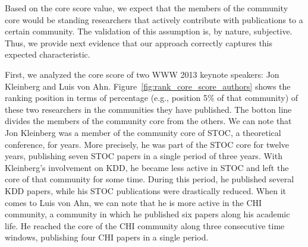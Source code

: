 Based on the core score value, we expect that the members of the community core would be standing researchers that actively contribute with publications to a certain community.
The validation of this assumption is, by nature, subjective.  Thus, we provide next evidence that our approach correctly captures this expected characteristic.

First, we analyzed the core score of two WWW 2013 keynote speakers: Jon Kleinberg and Luis von Ahn.  Figure~\ref{fig:rank_core_score_authors} shows the ranking position in terms of
percentage (e.g., position 5\% of that community) of these two researchers in the communities they have published. The botton line divides the members of the community core from the others.
We can note that Jon Kleinberg was a member of the community core of STOC, a theoretical conference, for years. More precisely, he was part of the STOC core for twelve years,
publishing seven STOC papers in a single period of three years. With Kleinberg's involvement on KDD, he became less active in STOC and left the core of that community for some time.
During this period, he published several KDD papers, while his STOC publications were drastically reduced.  When it comes to Luis von Ahn, we can note that he is more active in
the CHI community, a community in which he published six papers along his academic life. He reached the core of the CHI community along three consecutive time windows,
publishing four CHI papers in a single period.



